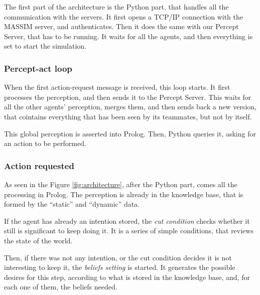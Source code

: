 \documentclass{llncs2e/llncs}
\begin{document}


    The first part of the architecture is the Python part, that handles all the 
    communication with the servers. It first opens a TCP/IP connection with the 
    MASSIM server, and authenticates. Then it does the same with our Percept 
    Server, that has to be running. It waits for all the agents, and then 
    everything is set to start the simulation.

\subsubsection{Percept-act loop}

    When the first action-request message is received, this loop starts. It 
    first processes the perception, and then sends it to the Percept Server. 
    This waits for all the other agents' perception, merges them, and then sends 
    back a new version, that cointains everything that has been seen by its
    teammates, but not by itself.
    
    This global perception is asserted into Prolog. Then, Python queries it,
    asking for an action to be performed.
    
\subsubsection{Action requested}

    As seen in the Figure \ref{fig:architecture}, after the Python part, comes 
    all the processing in Prolog. The perception is already in the knowledge 
    base, that is formed by the ``static'' and ``dynamic'' data. 

    If the agent has already an intention stored, the \textit{cut condition} 
    checks whether it still is significant to keep doing it. It is a series of 
    simple conditions, that reviews the state of the world.

    Then, if there was not any intention, or the cut condition decides it is not 
    interesting to keep it, the \textit{beliefs setting} is started. It 
    generates the possible desires for this step, according to what is stored in 
    the knowledge base, and, for each one of them, the beliefs needed.
\end{document}
